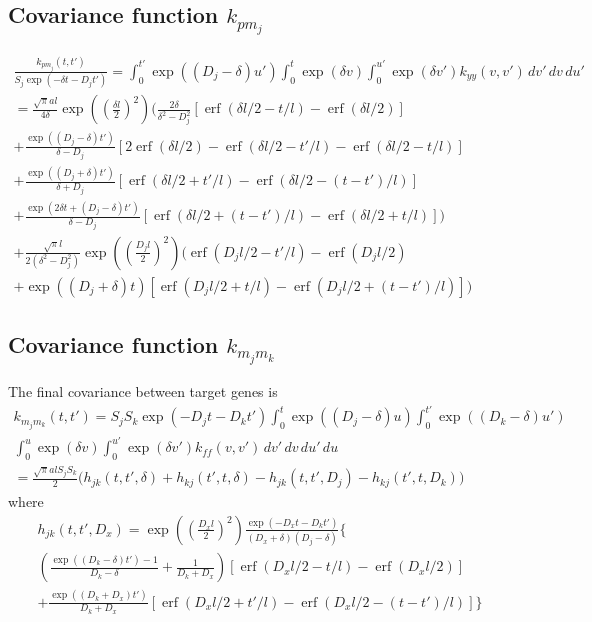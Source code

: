 \documentclass{article}
\newcommand{\erf}{\operatorname{erf}}
\begin{document}
\subsection{Covariance function $k_{pm_j}$}

\begin{multline}
  \frac{k_{p m_j}(t, t')}{S_j \exp(-\delta t - D_j t')} = 
  \int_0^{t'} \exp((D_j - \delta) u') \int_0^t \exp(\delta v) \int_0^{u'}
  \exp(\delta v') k_{yy}(v, v')\, dv'\, dv\, du' \\
  = 
  \frac{\sqrt{\pi}al}{4\delta}\exp\left(\left(\frac{\delta l}{2}\right)^2\right)
  \bigg(
  \frac{2 \delta}{\delta^2 - D_j^2}
  [\erf(\delta l / 2 - t/l) - \erf(\delta l / 2)]\\
  +
  \frac{\exp((D_j - \delta)t')}{\delta - D_j}
  [2\erf(\delta l / 2) - \erf(\delta l / 2 - t'/l) - \erf(\delta l / 2 - t/l)] \\
  +
  \frac{\exp((D_j + \delta)t')}{\delta + D_j}
  [\erf(\delta l / 2 + t'/l) - \erf(\delta l / 2 - (t-t')/l)]\\
  +
  \frac{\exp(2\delta t + (D_j - \delta)t')}{\delta - D_j}
  [\erf(\delta l / 2 + (t-t')/l) - \erf(\delta l / 2 + t/l)]
  \bigg) \\
  + \frac{\sqrt{\pi}l}{2(\delta^2 - D_j^2)}
  \exp\left(\left(\frac{D_j l}{2}\right)^2\right)
  \bigg(
  \erf(D_j l/2 - t'/l) - \erf(D_j l/2) \\
  + \exp((D_j + \delta) t) [\erf(D_j l/2 + t/l) - \erf(D_j l/2 + (t-t')/l)]
  \bigg)
\end{multline}

\subsection{Covariance function $k_{m_j m_k}$}

The final covariance between target genes is
\begin{multline}
  k_{m_j m_k}(t, t') = S_j S_k \exp(-D_j t - D_k t')
  \int_0^t \exp((D_j - \delta) u)
  \int_0^{t'} \exp((D_k - \delta) u') \\
  \int_0^u \exp(\delta v) \int_0^{u'} \exp(\delta v') k_{ff}(v, v') \, dv'\, dv\, du'\, du \\
  = \frac{\sqrt{\pi} a l S_j S_k}{2} \bigg(
  h_{jk}(t, t', \delta) + h_{kj}(t', t, \delta) 
  - h_{jk}(t, t', D_j) - h_{kj}(t', t, D_k)
  \bigg)
\end{multline}
where
\begin{multline}
  h_{jk}(t, t', D_x) = 
  \exp\left(\left(\frac{D_x l}{2}\right)^2\right)
  \frac{\exp(-D_x t - D_k t')}{(D_x + \delta) (D_j - \delta)}
  \bigg\{ 
   \\
  \left(\frac{\exp((D_k-\delta) t') - 1}{D_k-\delta} +
    \frac{1}{D_k + D_x} \right)
  [\erf(D_x l/2 - t/l) - \erf(D_x l/2)]
  \\
  + \frac{\exp((D_k+D_x)t')}{D_k+D_x}
  [\erf(D_x l/2 + t'/l)
  - \erf(D_x l/2 - (t-t')/l)]
  \bigg\} \\
\end{multline}
\end{document}
